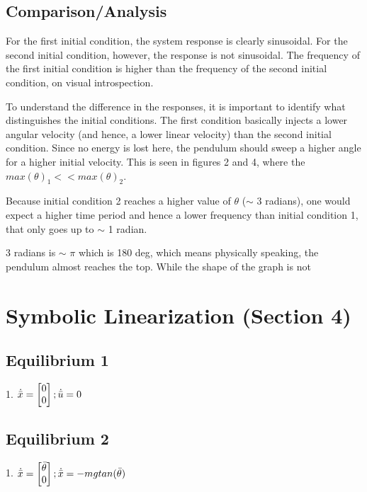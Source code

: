 \documentclass[10pt]{article}
\begin{document}
\subsection{Comparison/Analysis}
    For the first initial condition, the system response is clearly sinusoidal. For the second initial condition, however, the response is not sinusoidal. The frequency of the first initial condition is higher than the frequency of the second initial condition, on visual introspection. 
    
    To understand the difference in the responses, it is important to identify what distinguishes the initial conditions. The first condition basically injects a lower angular velocity (and hence, a lower linear velocity) than the second initial condition. Since no energy is lost here, the pendulum should sweep a higher angle for a higher initial velocity. This is seen in figures 2 and 4, where the \begin{math}
     max(\theta)_1 << max(\theta)_2
    \end{math}.
    
    Because initial condition 2 reaches a higher value of $\theta$ ($\sim$ 3 radians), one would expect a higher time period and hence a lower frequency than initial condition 1, that only goes up to $\sim$ 1 radian. 
    
    3 radians is $\sim$ $\pi$ which is 180 deg, which means physically speaking, the pendulum almost reaches the top. While the shape of the graph is not 
    

\section{Symbolic Linearization (Section 4)}

\subsection{Equilibrium 1}
\begin{center}
    1.
    \begin{math}
     \dot{\Bar{x}} = 
     \begin{bmatrix}
     0\\ 0
     \end{bmatrix}
     ;
     \dot{\Bar{u}} = 0
    \end{math}
\end{center}

\subsection{Equilibrium 2}
\begin{center}
    1.
    \begin{math}
     \dot{\Bar{x}} = 
     \begin{bmatrix}
     \Bar{\theta} \\ 0
     \end{bmatrix}
     ;
     \dot{\Bar{x}} = -mg tan(\Bar{\theta})
    \end{math}
\end{center}
\end{document}
